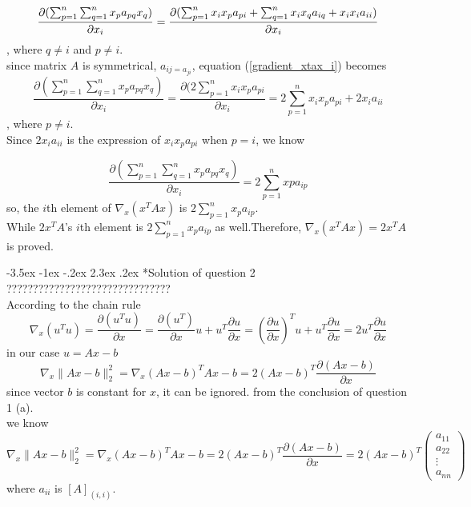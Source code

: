 \documentclass[12pt]{article}
\makeatletter
\renewcommand\section{\@startsection {section}{1}{\z@}%
	{-3.5ex \@plus -1ex \@minus -.2ex}%
	{2.3ex \@plus.2ex}%
	{\normalfont\large\bfseries}}%
\makeatother
\begin{document}
\begin{equation}\label{gradient_xtax_i}
	\frac{\partial(\sum_{p=1}^n \sum_{q=1}^n x_pa_{pq}x_q)}{\partial x_i} \\
	=\frac{\partial(\sum_{p=1}^n x_ix_pa_{pi}+\sum_{q=1}^n x_ix_qa_{iq}+x_ix_ia_{ii})}{\partial x_i}
\end{equation}
, where $q\neq i$ and $p\neq i$.
\\
since matrix $A$ is symmetrical, $a_{ij=a_{ji}}$, equation (\ref{gradient_xtax_i}) becomes
\begin{equation}\label{gradient_xtax_i_mod}
	\frac{\partial(\sum_{p=1}^n \sum_{q=1}^n x_pa_{pq}x_q)}{\partial x_i}
	=\frac{\partial(2\sum_{p=1}^n x_ix_pa_{pi}}{\partial x_i}=2\sum_{p=1}^n x_ix_pa_{pi}+2x_ia_{ii}
\end{equation}
, where $p\neq i$.\\
Since $2x_ia_{ii}$ is the expression of $x_ix_pa_{pi}$ when $p=i$, we know

\begin{equation}\label{gradient_xtax_i_final}
	\frac{\partial(\sum_{p=1}^n \sum_{q=1}^n x_pa_{pq}x_q)}{\partial x_i}
	=2\sum_{p=1}^n xpa_{ip}
\end{equation}
so, the $i$th element of $\nabla_x(x^TAx)$ is $2\sum_{p=1}^n x_pa_{ip}$.\\
\noindent
While $2x^TA$'s $i$th element is $2\sum_{p=1}^n x_pa_{ip}$ as well.Therefore, $\nabla_x(x^TAx)=2x^TA$ is proved.

\section*{Solution of question 2}
{\color{red} ???????????????????????????????}\\
According to the chain rule
\begin{equation}\label{chain_rule}
\nabla_x(u^Tu)=\frac{\partial(u^Tu)}{\partial x}=\frac{\partial(u^T)}{\partial x}u+u^T\frac{\partial u}{\partial x}=(\frac{\partial u}{\partial x})^Tu+u^T\frac{\partial u}{\partial x}=2u^T\frac{\partial u}{\partial x}
\end{equation}
in our case $u=Ax-b$
\begin{equation}\label{Ax-b_grad}
\nabla_x\lVert Ax-b\rVert_2^2=\nabla_x (Ax-b)^TAx-b=2(Ax-b)^T\frac{\partial(Ax-b)}{\partial x}
\end{equation}
since vector $b$ is constant for $x$, it can be ignored. from the conclusion of question 1 (a).\\
we know
\begin{equation}\label{Ax-b_grad_final}
\nabla_x\lVert Ax-b\rVert_2^2=\nabla_x (Ax-b)^TAx-b=2(Ax-b)^T\frac{\partial(Ax-b)}{\partial x}=2(Ax-b)^T
\left(  
\begin{array}{c}  
	a_{11} \\
	a_{22} \\
	\vdots \\
	a_{nn} 
\end{array}
\right)
\end{equation}
where $a_{ii}$ is $[A]_{(i,i)}$.
\end{document}
